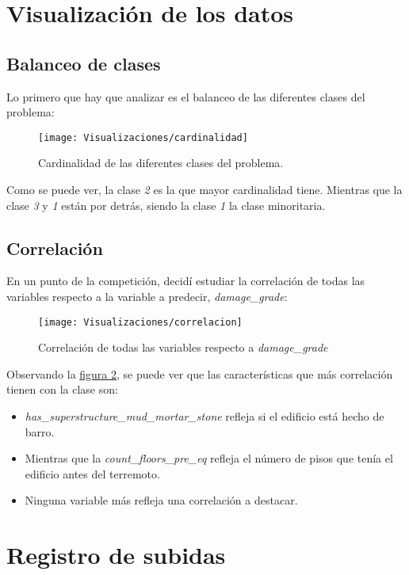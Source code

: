 \documentclass[paper=a4, fontsize=12pt]{article} %
\numberwithin{equation}{section} %
\numberwithin{figure}{section} %
\numberwithin{table}{section} %
\begin{document}
\newpage
\section{Visualización de los datos}
\subsection{Balanceo de clases}
Lo primero que hay que analizar es el balanceo de las diferentes clases del problema:

\begin{figure}[H]
  \centering
  \texttt{[image: Visualizaciones/cardinalidad]}
  \caption{Cardinalidad de las diferentes clases del problema.}
  \label{cardinalidad}
\end{figure}

Como se puede ver, la clase \textit{2} es la que mayor cardinalidad tiene. Mientras que la clase \textit{3} y \textit{1} están por detrás, siendo la clase \textit{1} la clase minoritaria.\\

\subsection{Correlación}
En un punto de la competición, decidí estudiar la correlación de todas las variables respecto a la variable a predecir, \textit{damage\_grade}:

\begin{figure}[H]
  \centering
  \texttt{[image: Visualizaciones/correlacion]}
  \caption{Correlación de todas las variables respecto a \textit{damage\_grade}}
  \label{correlacion}
\end{figure}

Observando la \hyperref[correlacion]{figura \ref*{correlacion}}, se puede ver que las características que más correlación tienen con la clase son:

\begin{itemize}
\item \textit{has\_superstructure\_mud\_mortar\_stone} refleja si el edificio está hecho de barro.
\item Mientras que la \textit{count\_floors\_pre\_eq} refleja el número de pisos que tenía el edificio antes del terremoto.
\item Ninguna variable más refleja una correlación a destacar.
\end{itemize}

\newpage
\section {Registro de subidas}
\end{document}
